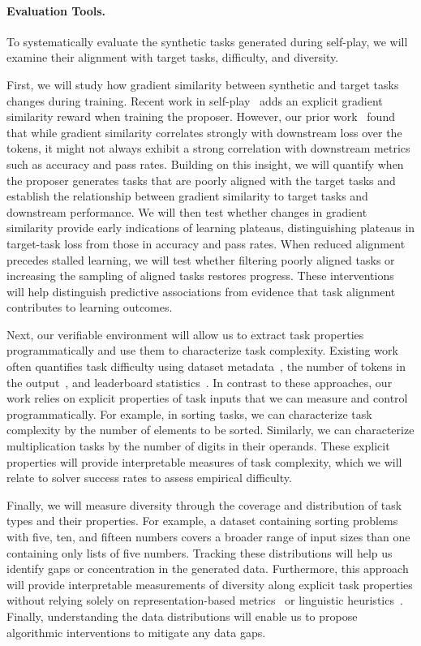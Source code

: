 \paragraph{Evaluation Tools.}
To systematically evaluate the synthetic tasks generated during self-play, we will examine their alignment with target tasks, difficulty, and diversity.

First, we will study how gradient similarity between synthetic and target tasks changes during training.
Recent work in self-play~\citep{pu2026compassplay} adds an explicit gradient similarity reward when training the proposer. 
However, our prior work~\citep{nayak:icml26} found that while gradient similarity correlates strongly with downstream loss over the tokens, it might not always exhibit a strong correlation with downstream metrics such as accuracy and pass rates.
Building on this insight, we will quantify when the proposer generates tasks that are poorly aligned with the target tasks and establish the relationship between gradient similarity to target tasks and downstream performance. 
We will then test whether changes in gradient similarity provide early indications of learning plateaus, distinguishing plateaus in target-task loss from those in accuracy and pass rates.
When reduced alignment precedes stalled learning, we will test whether filtering poorly aligned tasks or increasing the sampling of aligned tasks restores progress. 
These interventions will help distinguish predictive associations from evidence that task alignment contributes to learning outcomes.

Next, our verifiable environment will allow us to extract task properties programmatically and use them to characterize task complexity.
Existing work often quantifies task difficulty using dataset metadata~\citep{hase2024unreasonable}, the number of tokens in the output~\citep{lee2025self}, and leaderboard statistics~\citep{kordi:eacl26}.
In contrast to these approaches, our work relies on explicit properties of task inputs that we can measure and control programmatically.
For example, in sorting tasks, we can characterize task complexity by the number of elements to be sorted.
Similarly, we can characterize multiplication tasks by the number of digits in their operands.
These explicit properties will provide interpretable measures of task complexity, which we will relate to solver success rates to assess empirical difficulty.

Finally, we will measure diversity through the coverage and distribution of task types and their properties.
For example, a dataset containing sorting problems with five, ten, and fifteen numbers covers a broader range of input sizes than one containing only lists of five numbers.
Tracking these distributions will help us identify gaps or concentration in the generated data.
Furthermore, this approach will provide interpretable measurements of diversity along explicit task properties without relying solely on representation-based metrics~\citep{friedman2022vendi} or linguistic heuristics~\citep{pu2026compassplay}.
Finally, understanding the data distributions will enable us to propose algorithmic interventions to mitigate any data gaps. 


